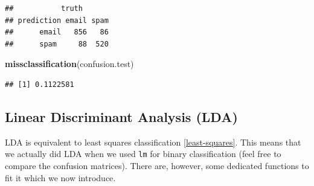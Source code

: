 \documentclass[]{book}
\newenvironment{Shaded}{\begin{snugshade}}{\end{snugshade}}
\newcommand{\KeywordTok}[1]{\textcolor[rgb]{0.13,0.29,0.53}{\textbf{#1}}}
\newcommand{\DataTypeTok}[1]{\textcolor[rgb]{0.13,0.29,0.53}{#1}}
\newcommand{\DecValTok}[1]{\textcolor[rgb]{0.00,0.00,0.81}{#1}}
\newcommand{\StringTok}[1]{\textcolor[rgb]{0.31,0.60,0.02}{#1}}
\newcommand{\CommentTok}[1]{\textcolor[rgb]{0.56,0.35,0.01}{\textit{#1}}}
\newcommand{\OperatorTok}[1]{\textcolor[rgb]{0.81,0.36,0.00}{\textbf{#1}}}
\newcommand{\NormalTok}[1]{#1}
\theoremstyle{definition}
\theoremstyle{definition}
\theoremstyle{definition}
\theoremstyle{remark}
\begin{document}
\begin{Shaded}
\end{Shaded}

\begin{verbatim}
##           truth
## prediction email spam
##      email   856   86
##      spam     88  520
\end{verbatim}

\begin{Shaded}
\begin{Highlighting}[]
\KeywordTok{missclassification}\NormalTok{(confusion.test)}
\end{Highlighting}
\end{Shaded}

\begin{verbatim}
## [1] 0.1122581
\end{verbatim}

\subsection{Linear Discriminant Analysis
(LDA)}\label{linear-discriminant-analysis-lda}

LDA is equivalent to least squares classification \ref{least-squares}.
This means that we actually did LDA when we used \texttt{lm} for binary
classification (feel free to compare the confusion matrices). There are,
however, some dedicated functions to fit it which we now introduce.

\begin{Shaded}
\end{Shaded}
\end{document}
